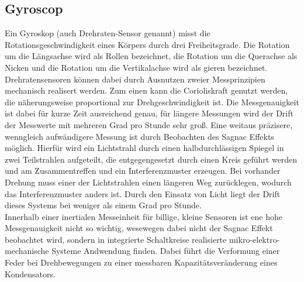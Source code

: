 \subsection{Gyroscop}
Ein Gyroskop (auch Drehraten-Sensor genannt) misst die Rotationsgeschwindigkeit eines Körpers durch drei Freiheitsgrade. Die Rotation um die Längsachse wird als Rollen bezeichnet, die Rotation um die Querachse als Nicken und die Rotation um die Vertikalachse wird als gieren bezeichnet. 
\\
Drehratensensoren können dabei durch Ausnutzen zweier Messprinzipien mechanisch realisert werden. Zum einen kann die Corioliskraft genutzt werden, die näherungsweise proportional zur Drehgeschwindigkeit ist. Die Messgenauigkeit ist dabei für kurze Zeit ausreichend genau, für längere Messungen wird der Drift der Messwerte mit mehreren Grad pro Stunde sehr groß. 
Eine weitaus präzisere, wenngleich aufwändigere Messung ist durch Beobachten des Sagnac Effekts möglich. Hierfür wird ein Lichtstrahl durch einen halbdurchlässigen Spiegel in zwei Teilstrahlen aufgeteilt, die entgegengesetzt durch einen Kreis geführt werden und am Zusammentreffen und ein Interferenzmuster erzeugen. Bei vorhander Drehung muss einer der Lichtstrahlen einen längeren Weg zurücklegen, wodurch das Interferenzmuster anders ist. Durch den Einsatz von Licht liegt der Drift dieses Systems bei weniger als einem Grad pro Stunde. 
\\
Innerhalb einer inertialen Messeinheit für billige, kleine Sensoren ist ene hohe Messgenauigkeit nicht so wichtig, wesewegen dabei nicht der Sagnac Effekt beobachtet wird, sondern in integrierte Schaltkreise realisierte mikro-elektro-mechanische Systeme Andwendung finden. Dabei führt die Verformung einer Feder bei Drehbewegungen zu einer messbaren Kapazitätsveränderung eines Kondensators.